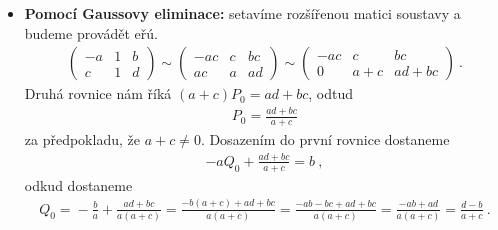 \begin{example}
    \begin{itemize}
        \item \textbf{Pomocí Gaussovy eliminace:} setavíme rozšířenou matici soustavy a budeme provádět eřú.
        \begin{align}
            \left(\begin{array}{cc|c}
                -a & 1 & b \\ c & 1 & d
            \end{array}\right)
            \sim
            \left(\begin{array}{cc|c}
                -ac & c & bc \\ ac & a & ad
            \end{array}\right)
            \sim
            \left(\begin{array}{cc|c}
                -ac & c & bc \\ 0 & a+c & ad+bc
            \end{array}\right) \:.
        \end{align}
        Druhá rovnice nám říká $(a+c)P_0 = ad+bc$, odtud 
        \begin{align}
            \boxed{ P_0 = \frac{ad+bc}{a+c} }
        \end{align}
        za předpokladu, že $a+c \neq 0$. Dosazením do první rovnice dostaneme
        \begin{align}
            -a Q_0 + \frac{ad+bc}{a+c} = b \:,
        \end{align}
        odkud dostaneme
        \begin{align} 
            \boxed{ Q_0 =} -\frac{b}{a} + \frac{ad+bc}{a(a+c)} = \frac{-b(a+c) + ad+bc}{a(a+c)} = \frac{-ab-bc + ad + bc}{a(a+c)} = \frac{-ab + ad}{a(a+c)} \boxed{= \frac{d-b}{a+c} } \:.
        \end{align}
        

\end{itemize}
\end{example}
